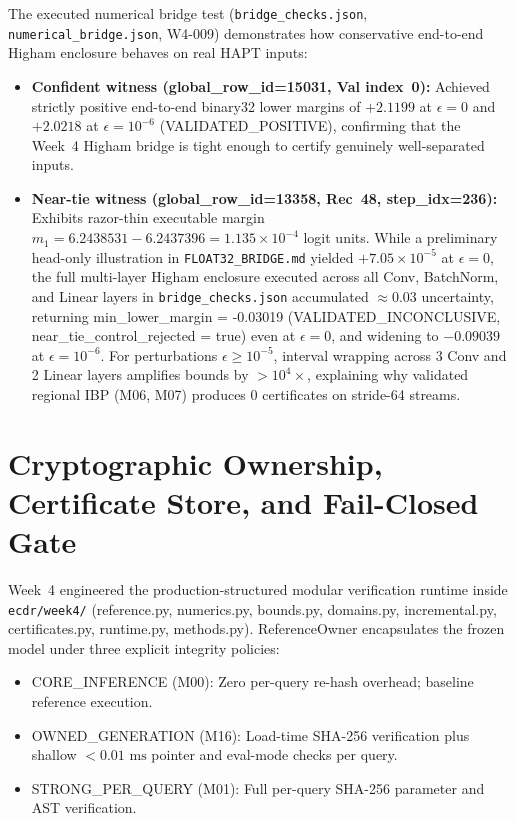 \documentclass[11pt,oneside,a4paper]{report}
\newcommand{\code}[1]{{\small\upshape\ttfamily #1}}
\newcommand{\pathcode}[1]{{\small\upshape\ttfamily\nolinkurl{#1}}}
\theoremstyle{remark}
\begin{document}
The executed numerical bridge test (\pathcode{bridge_checks.json}, \pathcode{numerical_bridge.json}, \code{W4-009}) demonstrates how conservative end-to-end Higham enclosure behaves on real HAPT inputs:
\begin{itemize}[leftmargin=1.5em]
  \item \textbf{Confident witness (\code{global\_row\_id=15031}, Val index~0):} Achieved strictly positive end-to-end \code{binary32} lower margins of $+2.1199$ at $\epsilon=0$ and $+2.0218$ at $\epsilon=10^{-6}$ (\code{VALIDATED\_POSITIVE}), confirming that the Week~4 Higham bridge is tight enough to certify genuinely well-separated inputs.
  \item \textbf{Near-tie witness (\code{global\_row\_id=13358}, Rec~48, \code{step\_idx=236}):} Exhibits razor-thin executable margin $m_1 = 6.2438531 - 6.2437396 = 1.135 \times 10^{-4}$ logit units. While a preliminary head-only illustration in \pathcode{FLOAT32_BRIDGE.md} yielded $+7.05 \times 10^{-5}$ at $\epsilon=0$, the full multi-layer Higham enclosure executed across all Conv, BatchNorm, and Linear layers in \pathcode{bridge_checks.json} accumulated ${\approx}0.03$ uncertainty, returning \code{min\_lower\_margin = -0.03019} (\code{VALIDATED\_INCONCLUSIVE}, \code{near\_tie\_control\_rejected = true}) even at $\epsilon=0$, and widening to $-0.09039$ at $\epsilon=10^{-6}$. For perturbations $\epsilon \ge 10^{-5}$, interval wrapping across 3 Conv and 2 Linear layers amplifies bounds by $>10^4\times$, explaining why validated regional IBP (\code{M06}, \code{M07}) produces $0$ certificates on stride-64 streams.
\end{itemize}

\section{Cryptographic Ownership, Certificate Store, and Fail-Closed Gate}
Week~4 engineered the production-structured modular verification runtime inside \pathcode{ecdr/week4/} (\code{reference.py}, \code{numerics.py}, \code{bounds.py}, \code{domains.py}, \code{incremental.py}, \code{certificates.py}, \code{runtime.py}, \code{methods.py}). \code{ReferenceOwner} encapsulates the frozen model under three explicit integrity policies:
\begin{itemize}[leftmargin=1.5em]
  \item \code{CORE\_INFERENCE} (\code{M00}): Zero per-query re-hash overhead; baseline reference execution.
  \item \code{OWNED\_GENERATION} (\code{M16}): Load-time SHA-256 verification plus shallow $<0.01\text{ ms}$ pointer and \code{eval}-mode checks per query.
  \item \code{STRONG\_PER\_QUERY} (\code{M01}): Full per-query SHA-256 parameter and AST verification.
\end{itemize}
\end{document}
